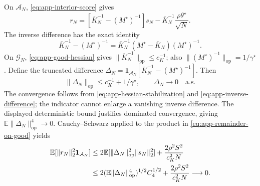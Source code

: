 \documentclass[10pt,twoside,letterpaper]{article}
\newcommand{\E}{\mathbb E}
\newcommand{\op}{\mathrm{op}}
\newcommand{\norm}[1]{\lVert #1\rVert}
\begin{document}
On $\mathcal A_N$, \eqref{eq:app-interior-score} gives
\begin{equation}
r_N=[\overline K_N^{-1}-(M^\star)^{-1}]s_N
-\overline K_N^{-1}\frac{\rho\theta^\star}{\sqrt N}.
\label{eq:app-remainder-on-good}
\end{equation}
The inverse difference has the exact identity
\begin{equation}
\overline K_N^{-1}-(M^\star)^{-1}
=\overline K_N^{-1}(M^\star-\overline K_N)(M^\star)^{-1}.
\label{eq:app-inverse-difference}
\end{equation}
On $\mathcal G_N$, \eqref{eq:app-good-hessian} gives
$\norm{\overline K_N^{-1}}_{\op}\le c_K^{-1}$; also
$\norm{(M^\star)^{-1}}_{\op}=1/\gamma^\star$.
Define the truncated difference
$\Delta_N=\mathbf1_{\mathcal A_N}
[\overline K_N^{-1}-(M^\star)^{-1}]$.
Then
\begin{equation}
\norm{\Delta_N}_{\op}\le c_K^{-1}+1/\gamma^\star,
\qquad
\Delta_N\to0\quad\text{a.s.}
\label{eq:app-truncated-inverse}
\end{equation}
The convergence follows from \eqref{eq:app-hessian-stabilization} and
\eqref{eq:app-inverse-difference}; the indicator cannot enlarge a
vanishing inverse difference. The displayed deterministic bound
justifies dominated convergence, giving
$\E\norm{\Delta_N}_{\op}^4\to0$.
Cauchy--Schwarz applied to the product in
\eqref{eq:app-remainder-on-good} yields
\begin{align}
\E[\norm{r_N}_2^2\mathbf1_{\mathcal A_N}]
&\le2\E[\norm{\Delta_N}_{\op}^2\norm{s_N}_2^2]
+\frac{2\rho^2S^2}{c_K^2N}\notag\\
&\le2(\E\norm{\Delta_N}_{\op}^4)^{1/2}C_4^{1/2}
+\frac{2\rho^2S^2}{c_K^2N}\longrightarrow0.
\label{eq:app-good-remainder-l2}
\end{align}
\end{document}
